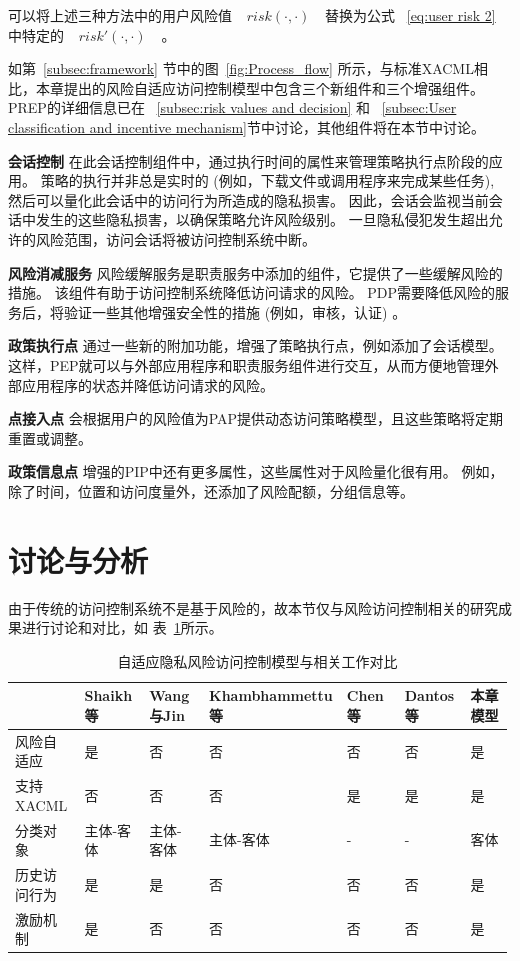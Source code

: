 可以将上述三种方法中的用户风险值 ~$~risk(\cdot,\cdot)~$~ 替换为公式 ~\ref{eq:user risk 2} 中特定的 ~$~risk'(\cdot,\cdot)~$~ 。


如第~\ref{subsec:framework} 节中的图~\ref{fig:Process_flow} 所示，与标准XACML相比，本章提出的风险自适应访问控制模型中包含三个新组件和三个增强组件。PREP的详细信息已在 ~\ref{subsec:risk values and decision} 和 ~\ref{subsec:User classification and incentive mechanism}节中讨论，其他组件将在本节中讨论。

\textbf{会话控制} 在此会话控制组件中，通过执行时间的属性来管理策略执行点阶段的应用。 策略的执行并非总是实时的 (例如，下载文件或调用程序来完成某些任务), 然后可以量化此会话中的访问行为所造成的隐私损害。 因此，会话会监视当前会话中发生的这些隐私损害，以确保策略允许风险级别。 一旦隐私侵犯发生超出允许的风险范围，访问会话将被访问控制系统中断。

\textbf{风险消减服务} 风险缓解服务是职责服务中添加的组件，它提供了一些缓解风险的措施。 该组件有助于访问控制系统降低访问请求的风险。 PDP需要降低风险的服务后，将验证一些其他增强安全性的措施 (例如，审核，认证) 。

\textbf{政策执行点} 通过一些新的附加功能，增强了策略执行点，例如添加了会话模型。 这样，PEP就可以与外部应用程序和职责服务组件进行交互，从而方便地管理外部应用程序的状态并降低访问请求的风险。

\textbf{点接入点} 会根据用户的风险值为PAP提供动态访问策略模型，且这些策略将定期重置或调整。

\textbf{政策信息点} 增强的PIP中还有更多属性，这些属性对于风险量化很有用。 例如，除了时间，位置和访问度量外，还添加了风险配额，分组信息等。

\section{讨论与分析}
\label{sec:Discussion and analysis}
由于传统的访问控制系统不是基于风险的，故本节仅与风险访问控制相关的研究成果进行讨论和对比，如 表~\ref{tab:rabac-comparison}所示。

\begin{table}[htbp]
	\caption{自适应隐私风险访问控制模型与相关工作对比}
	\label{tab:rabac-comparison}
	\centering
	\small
	\begin{tabular}{p{0.15\linewidth}p{0.14\linewidth}p{0.14\linewidth}p{0.14\linewidth}p{0.14\linewidth}p{0.14\linewidth}p{0.14\linewidth}}
		\toprule
		 & Shaikh等~\cite{shaikh2012dynamic} & Wang与Jin~\cite{wang2011quantified}& Khambhammettu等~\cite{khambhammettu2013framework}& Chen等~\cite{chen2013xacml}& Dantos等~\cite{santos2014dynamic}& 本章模型\\
		\midrule
		风险自适应 & 是 &否  &否 &否 &否 &是\\
		支持XACML & 否 &否  &否 &是 &是 &是\\
		分类对象  &主体-客体 &主体-客体 &主体-客体 &- &- &客体\\
		历史访问行为 & 是 &是  &否 &否 &否 &是\\
		激励机制& 是 &否  &否 &否 &否 &是\\
		\bottomrule
	\end{tabular}
\end{table}

